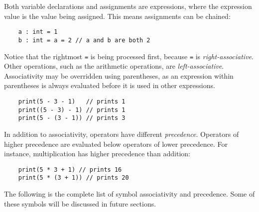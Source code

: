 \documentclass[main.tex]{subfiles}
\begin{document}
	Both variable declarations and assignments are expressions, where the expression value is the value being assigned. This means assignments can be chained:
	
	\begin{lstlisting}
	a : int = 1
	b : int = a = 2 // a and b are both 2 \end{lstlisting}
	
	Notice that the rightmost \texttt{=} is being processed first, because \texttt{=} is \textit{right-associative}. Other operations, such as the arithmetic operations, are \textit{left-associative}. Associativity may be overridden using parentheses, as an expression within parentheses is always evaluated before it is used in other expressions.
	
	\begin{lstlisting}
	print(5 - 3 - 1)   // prints 1
	print((5 - 3) - 1) // prints 1
	print(5 - (3 - 1)) // prints 3 \end{lstlisting}
	
	In addition to associativity, operators have different \textit{precedence}. Operators of higher precedence are evaluated below operators of lower precedence. For instance, multiplication has higher precedence than addition:
	
	\begin{lstlisting}
	print(5 * 3 + 1) // prints 16
	print(5 * (3 + 1)) // prints 20 \end{lstlisting}
	
	The following is the complete list of symbol associativity and precedence. Some of these symbols will be discussed in future sections.
	
\end{document}
